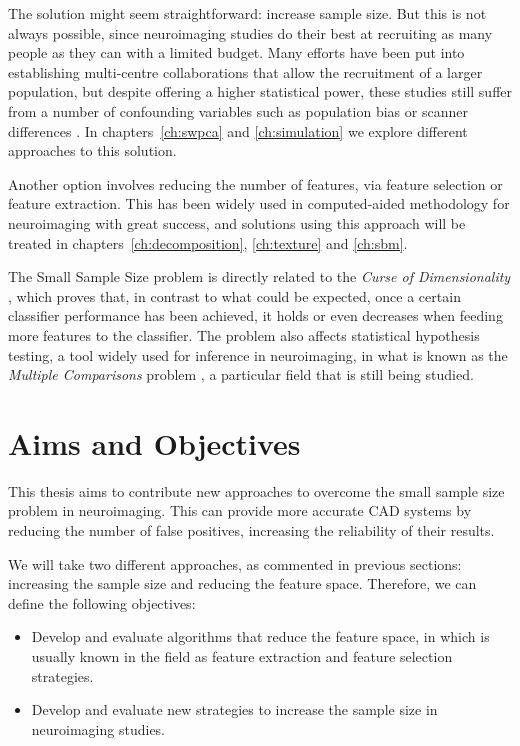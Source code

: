The solution might seem straightforward: increase sample size. But this is not always possible, since neuroimaging studies do their best at recruiting as many people as they can with a limited budget. Many efforts have been put into establishing multi-centre collaborations that allow the recruitment of a larger population, but despite offering a higher statistical power, these studies still suffer from a number of confounding variables such as population bias or scanner differences \cite{haar2014anatomical}. In chapters~\ref{ch:swpca} and \ref{ch:simulation} we explore different approaches to this solution. 

Another option involves reducing the number of features, via feature selection or feature extraction. This has been widely used in computed-aided methodology for neuroimaging \cite{DeMartino2007,Xu2009,Gorriz2010,Illan2011,Martinez-Murcia2016} with great success, and solutions using this approach will be treated in chapters~\ref{ch:decomposition}, \ref{ch:texture} and \ref{ch:sbm}. 

The Small Sample Size problem is directly related to the \textit{Curse of Dimensionality} \cite{Krishnaiah1982}, which proves that, in contrast to what could be expected, once a certain classifier performance has been achieved, it holds or even decreases when feeding more features to the classifier. The problem also affects statistical hypothesis testing, a tool widely used for inference in neuroimaging, in what is known as the \textit{Multiple Comparisons} problem \cite{Benjamini2010}, a particular field that is still being studied. 

\section{Aims and Objectives}\label{sec:overview}
This thesis aims to contribute new approaches to overcome the small sample size problem in neuroimaging. This can provide more accurate \ac{CAD} systems by reducing the number of false positives, increasing the reliability of their results. 

We will take two different approaches, as commented in previous sections: increasing the sample size and reducing the feature space. Therefore, we can define the following objectives: 

\begin{itemize}
	\item Develop and evaluate algorithms that reduce the feature space, in which is usually known in the field as feature extraction and feature selection strategies. 
	\item Develop and evaluate new strategies to increase the sample size in neuroimaging studies. 
\end{itemize}


